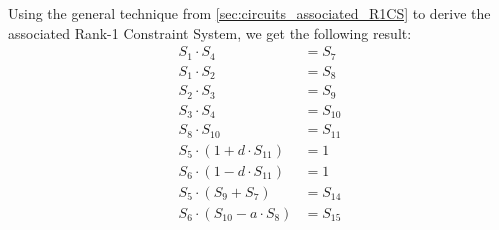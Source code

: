 Using the general technique from \ref{sec:circuits_associated_R1CS} to derive the associated Rank-1 Constraint System, we get the following result:
\begin{align*}
S_1 \cdot S_4 & = S_7 \\
S_1 \cdot S_2 & = S_8 \\
S_2 \cdot S_3 & = S_9 \\
S_3 \cdot S_4 & = S_{10} \\
S_8 \cdot S_{10} & = S_{11} \\
S_5 \cdot (1+ d\cdot S_{11}) & = 1 \\
S_6 \cdot (1 - d\cdot S_{11}) & = 1 \\
S_5 \cdot (S_9 + S_7) & = S_{14} \\
S_6 \cdot (S_{10} - a\cdot S_8) & = S_{15}
\end{align*}

